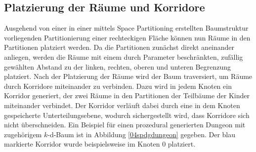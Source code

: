 \subsection{Platzierung der Räume und Korridore}
Ausgehend von einer in einer mittels Space Partitioning erstellten Baumstruktur vorliegenden Partitionierung einer rechteckigen Fläche können nun Räume in den Partitionen platziert werden. Da die Partitionen zunächst direkt aneinander anliegen, werden die Räume mit einem durch Parameter beschränkten, zufällig gewählten Abstand zu der linken, rechten, oberen und unteren Begrenzung platziert. Nach der Platzierung der Räume wird der Baum traversiert, um Räume durch Korridore miteinander zu verbinden. Dazu wird in jedem Knoten ein Korridor generiert, der zwei Räume in den Partitionen der Teilbäume der Kinder miteinander verbindet. Der Korridor verläuft dabei durch eine in dem Knoten gespeicherte Unterteilungsebene, wodurch sichergestellt wird, dass Korridore sich nicht überschneiden. Ein Beispiel für einen prozedural generierten Dungeon mit zugehörigem $k$-d-Baum ist in Abbildung \ref{04spdgdungeon} gegeben. Der blau markierte Korridor wurde beispielsweise im Knoten $0$ platziert.
